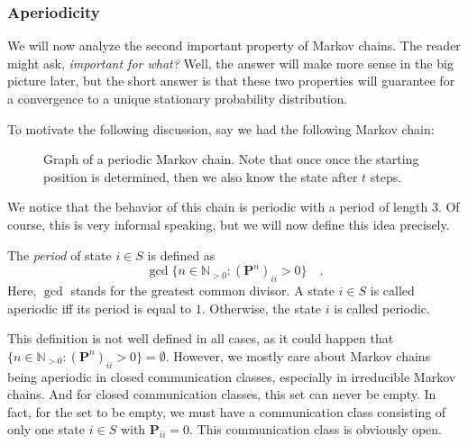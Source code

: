 \documentclass[../../main.tex]{subfiles}
\begin{document}
\subsubsection{Aperiodicity}
We will now analyze the second important property of Markov chains. The reader might ask, \emph{important for what?} Well, the answer will make more sense in the big picture later, but the short answer is that these two properties will guarantee for a convergence to a unique stationary probability distribution.

To motivate the following discussion, say we had the following Markov chain:

\begin{figure}[h]
    \center
    \caption{Graph of a periodic Markov chain. Note that once once the starting position is determined, then we also know the state after $t$ steps.}
    \label{fig:markov_chain_periodic}
\end{figure}

We notice that the behavior of this chain is periodic with a period of length $3$. Of course, this is very informal speaking, but we will now define this idea precisely.

\begin{definition}
    The \emph{period} of state $i \in S$ is defined as
    \[ \gcd \{ n \in \mathbb{N}_{>0} : (\bm{P}^n)_{ii} > 0 \} \quad . \]
    Here, $\gcd$ stands for the greatest common divisor. A state $i \in S$ is called aperiodic iff its period is equal to $1$. Otherwise, the state $i$ is called periodic.
\end{definition}

\begin{remark}
    This definition is not well defined in all cases, as it could happen that $\{ n \in \mathbb{N}_{>0} : (\bm{P}^n)_{ii} > 0 \} = \emptyset$. However, we mostly care about Markov chains being aperiodic in closed communication classes, especially in irreducible Markov chains. And for closed communication classes, this set can never be empty. In fact, for the set to be empty, we must have a communication class consisting of only one state $i \in S$ with $\bm{P}_{ii} = 0$. This communication class is obviously open.
\end{remark}
\end{document}
